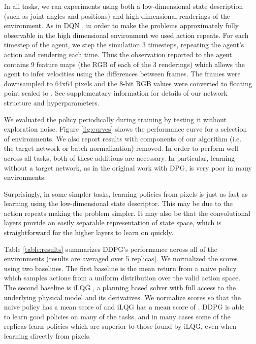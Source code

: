\documentclass{article} \usepackage{iclr2016_conference,times}
\begin{document}
In all tasks, we ran experiments using both a low-dimensional state
description (such as joint angles and positions) and high-dimensional
renderings of the environment. As in DQN \citep{mnih2013playing,
  mnih2015human}, in order to make the problems approximately fully
observable in the high dimensional environment we used action
repeats. For each timestep of the agent, we step the simulation 3
timesteps, repeating the agent's action and rendering each time.  Thus
the observation reported to the agent contains 9 feature maps (the RGB
of each of the 3 renderings) which allows the agent to infer
velocities using the differences between frames. The frames were
downsampled to 64x64 pixels and the 8-bit RGB values were converted to
floating point scaled to . See supplementary information for
details of our network structure and hyperparameters.

We evaluated the policy periodically during training by testing it without
exploration noise. Figure
\ref{fig:curves} shows the performance curve for a selection of environments.
We also report results with components of our algorithm (i.e. the target
network or batch normalization) removed. In order to perform well across
all tasks, both of these additions are necessary. In particular, learning
without a target network, as in the original work with DPG,
is very poor in many environments.

Surprisingly, in some simpler tasks, learning policies from pixels is
just as fast as learning using the low-dimensional state
descriptor.  This may be due to the action repeats making the problem
simpler.  It may also be that the convolutional
layers provide an easily separable representation of state space,
which is straightforward for the higher layers to learn on quickly.


Table \ref{table:results} summarizes DDPG's performance across all of
the environments (results are averaged over 5
replicas).
We normalized the scores using two baselines.
The first baseline is the mean return from a naive policy
which samples actions from a uniform distribution over the valid
action space. The second baseline is iLQG
\citep{todorov2005generalized}, a planning based solver with full
access to the underlying physical model and its derivatives. We
normalize scores so that the naive policy has a mean score of  and
iLQG has a mean score of .
DDPG is
able to learn good policies on many of the tasks, and in many cases
some of the replicas learn policies which are superior to those found
by iLQG, even when learning directly from pixels.
\end{document}
